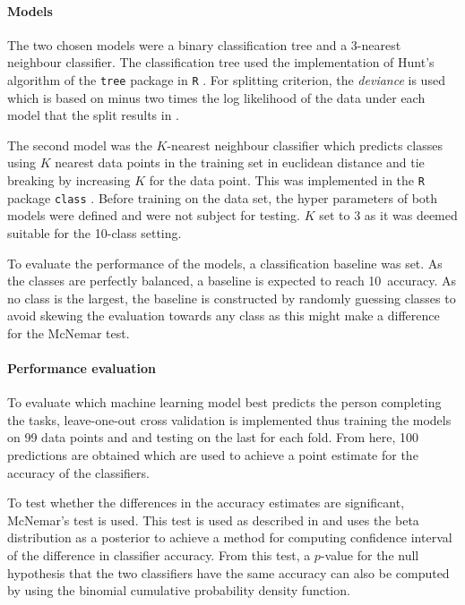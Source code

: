 \documentclass[11pt,fleqn]{article}
\begin{document}
\paragraph{Models} The two chosen models were a binary classification tree and a 3-nearest neighbour classifier. The classification tree used the implementation of Hunt's algorithm of the \texttt{tree} package in \texttt{R} \cite{Tree}. For splitting criterion, the \textit{deviance} is used which is based on minus two times the log likelihood of the data under each model that the split results in \cite{Deviance}.

The second model was the \(K\)-nearest neighbour classifier which predicts classes using \(K\) nearest data points in the training set in euclidean distance and tie breaking by increasing \(K\) for the data point. This was implemented in the \texttt{R} package \texttt{class} \cite{KNN}. Before training on the data set, the hyper parameters of both models were defined and were not subject for testing. \(K\) set to 3 as it was deemed suitable for the 10-class setting.

To evaluate the performance of the models, a classification baseline was set. As the classes are perfectly balanced, a baseline is expected to reach 10\pro\ accuracy. As no class is the largest, the baseline is constructed by randomly guessing classes to avoid skewing the evaluation towards any class as this might make a difference for the McNemar test.


\paragraph{Performance evaluation}
To evaluate which machine learning model best predicts the person completing the tasks, leave-one-out cross validation is implemented thus training the models on 99 data points and and testing on the last for each fold.
From here, 100 predictions are obtained which are used to achieve a point estimate for the accuracy of the classifiers.

To test whether the differences in the accuracy estimates are significant, McNemar's test is used. 
This test is used as described in \cite[Method 11.3.2]{Tue} and uses the beta distribution as a posterior to achieve a method for computing confidence interval of the difference in classifier accuracy.
From this test, a \(p\)-value for the null hypothesis that the two classifiers have the same accuracy can also be computed by using the binomial cumulative probability density function.
\end{document}
